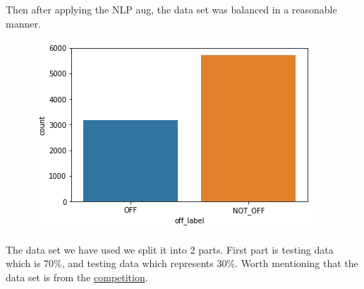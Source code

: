 \documentclass{IEEEtran}
\begin{document}
Then after applying the NLP aug, the data set was balanced in a reasonable manner.

\begin{figure}[htbp]
\includegraphics[width=\columnwidth, height=0.22\paperheight]{01.png}
\end{figure}

The data set we have used we split it into 2 parts. First part is testing data which is 70\%, and testing data which represents 30\%. Worth mentioning that the data set is from the \href{https://sites.google.com/view/arabichate2022/home}{competition}.



\end{document}
